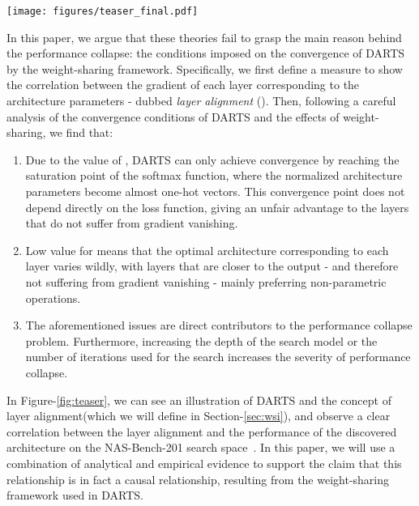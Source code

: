 \documentclass{article} \usepackage{fancyhdr, iclr2023_conference, times}
\newcommand{\lambdafn}{layer alignment\xspace}
\begin{document}
\begin{figure*}[tb]
\centering
\vspace{-15pt}
\texttt{[image: figures/teaser\_final.pdf]}
\vspace{-5pt}
\caption{An illustration of the differentiable formulation for NAS by DARTS, and the effects of \lambdafn over the trajectory of the performance of the discovered architectures by DARTS and -DARTS. The experiments are performed on the NAS-Bench-201 search space, averaged over 4 runs with a  confidence interval.}
\vspace{-15pt}
\label{fig:teaser}
\end{figure*}


In this paper, we argue that these theories fail to grasp the main reason behind the performance collapse: the conditions imposed on the convergence of DARTS by the weight-sharing framework. Specifically, we first define a measure to show the correlation between the gradient of each layer corresponding to the architecture parameters - dubbed \textit{\lambdafn} (). Then, following a careful analysis of the convergence conditions of DARTS and the effects of weight-sharing, we find that:
\begin{enumerate}[itemsep=0em]
    \item Due to the value of , DARTS can only achieve convergence by reaching the saturation point of the softmax function, where the normalized architecture parameters become almost one-hot vectors. This convergence point does not depend directly on the loss function, giving an unfair advantage to the layers that do not suffer from gradient vanishing.
    \item Low value for  means that the optimal architecture corresponding to each layer varies wildly, with layers that are closer to the output - and therefore not suffering from gradient vanishing - mainly preferring non-parametric operations.
    \item The aforementioned issues are direct contributors to the performance collapse problem. Furthermore, increasing the depth of the search model or the number of iterations used for the search increases the severity of performance collapse.
\end{enumerate}
In Figure-\ref{fig:teaser}, we can see an illustration of DARTS and the concept of \lambdafn (which we will define in Section-\ref{sec:wsi}), and observe a clear correlation between the \lambdafn and the performance of the discovered architecture on the NAS-Bench-201 search space~\citep{DBLP:conf/iclr/Dong020}. In this paper, we will use a combination of analytical and empirical evidence to support the claim that this relationship is in fact a causal relationship, resulting from the weight-sharing framework used in DARTS. 
\end{document}
